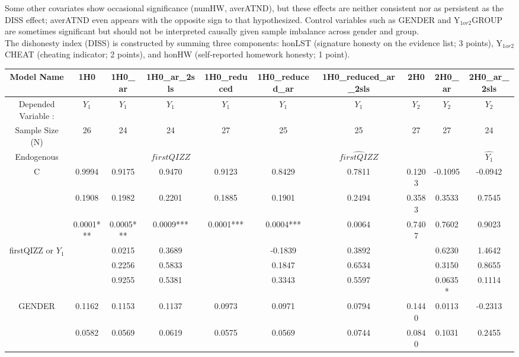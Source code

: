 \documentclass[]{article}
\begin{document}
	Some other covariates show occasional significance (numHW, averATND), but these effects are neither consistent nor as persistent as the DISS effect; averATND even appears with the opposite sign to that hypothesized. Control variables such as GENDER and Y$_{1or2}$GROUP are sometimes significant but should not be interpreted causally given sample imbalance across gender and group. \\
	
	The dishonesty index (DISS) is constructed by summing three components: honLST (signature honesty on the evidence list; 3 points), Y$_{1or2}$CHEAT (cheating indicator; 2 points), and honHW (self‑reported homework honesty; 1 point).
	
	 \begin{landscape}
	 	\begin{table}[htp] 
	 		\centering 
	 		\begin{adjustbox}{height=0.525\textheight,width=1.5\textwidth}
	 		\begin{tabular}{c|ccc|ccc|ccc}
		\hline
		Model Name & 1H0 & 1H0\_ar & 1H0\_ar\_2sls & 1H0\_reduced & 1H0\_reduced\_ar & 1H0\_reduced\_ar\_2sls & 2H0 & 2H0\_ar & 2H0\_ar\_2sls \\
		\hline
		Depended Variable : & $Y_1$ & $Y_1$ & $Y_1$ & $Y_1$ & $Y_1$ & $Y_1$ & $Y_2$ & $Y_2$ & $Y_2$ \\
		Sample Size (N)& 26 & 24 & 24 & 27 & 25 & 25 & 27 & 27 & 24  \\
		\hline
		Endogenous &  &  & $\hat{firstQIZZ}$ &  &  & $\hat{firstQIZZ}$ &  &  & $\hat{Y_1}$ \\
		\hline
		C & 0.9994 & 0.9175 & 0.9470 & 0.9123 & 0.8429 & 0.7811 & 0.1203 & -0.1095 & -0.0942 \\
		& 0.1908 & 0.1982 & 0.2201 & 0.1885 & 0.1901 & 0.2494 & 0.3583 & 0.3533 & 0.7545 \\
		& 0.0001*** & 0.0005*** & 0.0009*** & 0.0001*** & 0.0004*** & 0.0064 & 0.7407 & 0.7602 & 0.9023 \\
		\hline
		firstQIZZ or $Y_1$ &  & 0.0215 & 0.3689 &  & -0.1839 & 0.3892 &  & 0.6230 & 1.4642 \\
		&  & 0.2256 & 0.5833 &  & 0.1847 & 0.6534 &  & 0.3150 & 0.8655 \\
		&  & 0.9255 & 0.5381 &  & 0.3343 & 0.5597 &  & 0.0635* & 0.1114 \\
		\hline
		GENDER & 0.1162 & 0.1153 & 0.1137 & 0.0973 & 0.0971 & 0.0794 & 0.1440 & 0.0113 & -0.2313 \\
		& 0.0582 & 0.0569 & 0.0619 & 0.0575 & 0.0569 & 0.0744 & 0.0840 & 0.1031 & 0.2455 \\

\end{tabular}
\end{adjustbox}
\end{table}
\end{landscape}
\end{document}
